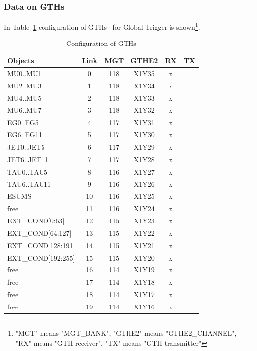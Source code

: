 \clearpage

\subsubsection{Data on GTHs}\label{sec:app:gth_conf_table}

In Table~\ref{tab:app:gth_conf} configuration of GTHs~\cite{GTHs} for Global Trigger is shown\footnote{"MGT" means "MGT\_BANK", "GTHE2" means "GTHE2\_CHANNEL", "RX" means "GTH receiver", "TX" means "GTH transmitter"}.

\begin{longtable}{|l|c|c|c|c|c|}
\caption{Configuration of GTHs}
    \label{tab:app:gth_conf}\\
\hline
\textbf{Objects}& \textbf{Link}& \textbf{MGT}& \textbf{GTHE2}& \textbf{RX}& \textbf{TX}\\
\hline
\hline
\endhead
MU0..MU1  & 0  & 118 & X1Y35 & x &   \\\hline
MU2..MU3  & 1  & 118 & X1Y34 & x &   \\\hline
MU4..MU5  & 2  & 118 & X1Y33 & x &   \\\hline
MU6..MU7  & 3  & 118 & X1Y32 & x &   \\\hline
EG0..EG5  & 4  & 117 & X1Y31 & x &   \\\hline
EG6..EG11 & 5  & 117 & X1Y30 & x &   \\\hline
JET0..JET5  & 6  & 117 & X1Y29 & x &   \\\hline
JET6..JET11 & 7  & 117 & X1Y28 & x &   \\\hline
TAU0..TAU5  & 8  & 116 & X1Y27 & x &   \\\hline
TAU6..TAU11 & 9  & 116 & X1Y26 & x &   \\\hline
ESUMS  & 10  & 116 & X1Y25 & x &   \\\hline
free & 11  & 116 & X1Y24 & x &   \\\hline
EXT\_COND[0:63] & 12  & 115 & X1Y23 & x &   \\\hline
EXT\_COND[64:127] & 13  & 115 & X1Y22 & x &   \\\hline
EXT\_COND[128:191] & 14  & 115 & X1Y21 & x &   \\\hline
EXT\_COND[192:255] & 15  & 115 & X1Y20 & x &   \\\hline
free & 16  & 114 & X1Y19 & x &   \\\hline
free & 17  & 114 & X1Y18 & x &   \\\hline
free & 18  & 114 & X1Y17 & x &   \\\hline
free & 19  & 114 & X1Y16 & x &   \\\hline

\end{longtable}
